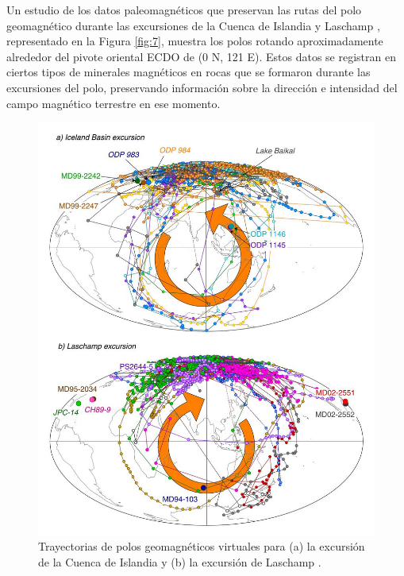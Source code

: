 \documentclass[10pt,twocolumn,letterpaper]{article}
\begin{document}
Un estudio de los datos paleomagnéticos que preservan las rutas del polo geomagnético durante las excursiones de la Cuenca de Islandia y Laschamp \cite{35}, representado en la Figura \ref{fig:7}, muestra los polos rotando aproximadamente alrededor del pivote oriental ECDO de (0 N, 121 E). Estos datos se registran en ciertos tipos de minerales magnéticos en rocas que se formaron durante las excursiones del polo, preservando información sobre la dirección e intensidad del campo magnético terrestre en ese momento.
\begin{figure}[t]
\begin{center}
   \includegraphics[width=0.95\linewidth]{laj.jpg}
\end{center}
   \caption{Trayectorias de polos geomagnéticos virtuales para (a) la excursión de la Cuenca de Islandia y (b) la excursión de Laschamp \cite{35}.}
\label{fig:7}
\label{fig:onecol}
\end{figure}
\end{document}
